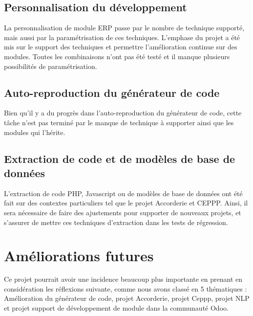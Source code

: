 \subsection{Personnalisation du développement}
La personnalisation de module ERP passe par le nombre de technique supporté, mais aussi par la paramétrisation de ces techniques. L'emphase du projet a été mis sur le support des techniques et permettre l'amélioration continue sur des modules. Toutes les combinaisons n'ont pas été testé et il manque plusieurs possibilités de paramétrisation.

\subsection{Auto-reproduction du générateur de code}
Bien qu'il y a du progrès dans l'auto-reproduction du générateur de code, cette tâche n'est pas terminé par le manque de technique à supporter ainsi que les modules qui l'hérite.

\subsection{Extraction de code et de modèles de base de données}
L'extraction de code PHP, Javascript ou de modèles de base de données ont été fait sur des contextes particuliers tel que le projet Accorderie et CEPPP. Ainsi, il sera nécessaire de faire des ajustements pour supporter de nouveaux projets, et s'assurer de mettre ces techniques d'extraction dans les tests de régression.

\section{Améliorations futures}


Ce projet pourrait avoir une incidence beaucoup plus importante en prenant en considération les réflexions suivante, comme nous avons classé en 5 thématiques : Amélioration du générateur de code, projet Accorderie, projet Ceppp, projet NLP et projet support de développement de module dans la communauté Odoo.

